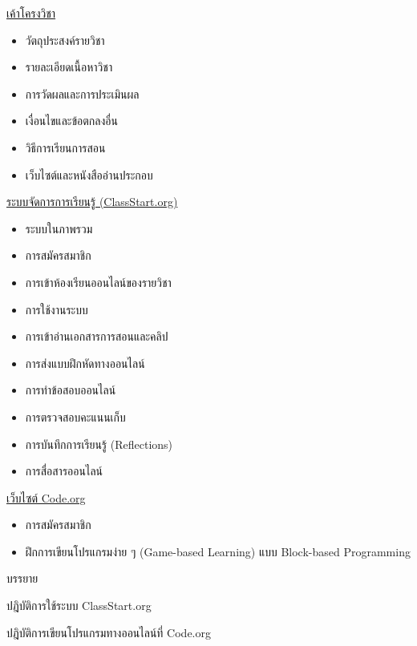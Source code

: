 
{
\underline{เค้าโครงวิชา}

\begin{itemize}
\item วัตถุประสงค์รายวิชา
\item รายละเอียดเนื้อหาวิชา
\item การวัดผลและการประเมินผล
\item เงื่อนไขและข้อตกลงอื่น
\item วิธีการเรียนการสอน
\item เว็บไซต์และหนังสืออ่านประกอบ
\end{itemize}

\underline{ระบบจัดการการเรียนรู้ (ClassStart.org)}
\begin{itemize}
\item ระบบในภาพรวม
\item การสมัครสมาชิก
\item การเข้าห้องเรียนออนไลน์ของรายวิชา
\item การใช้งานระบบ
\item การเข้าอ่านเอกสารการสอนและคลิป
\item การส่งแบบฝึกหัดทางออนไลน์
\item การทำข้อสอบออนไลน์
\item การตรวจสอบคะแนนเก็บ
\item การบันทึกการเรียนรู้ (Reflections)
\item การสื่อสารออนไลน์
\end{itemize}

\underline{เว็บไซต์ Code.org}
\begin{itemize}
\item การสมัครสมาชิก
\item ฝึกการเขียนโปรแกรมง่าย ๆ (Game-based Learning) แบบ Block-based Programming
\end{itemize}
}
{
\item บรรยาย
\item ปฎิบัติการใช้ระบบ ClassStart.org
\item ปฎิบัติการเขียนโปรแกรมทางออนไลน์ที่ Code.org
}

